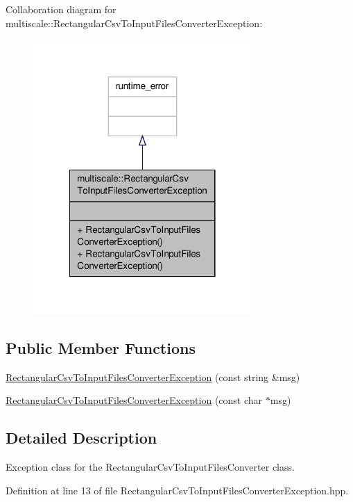 Collaboration diagram for multiscale\-:\-:Rectangular\-Csv\-To\-Input\-Files\-Converter\-Exception\-:\nopagebreak
\begin{figure}[H]
\begin{center}
\leavevmode
\includegraphics[width=236pt]{classmultiscale_1_1RectangularCsvToInputFilesConverterException__coll__graph}
\end{center}
\end{figure}
\subsection*{Public Member Functions}
\begin{DoxyCompactItemize}
\item 
\hyperlink{classmultiscale_1_1RectangularCsvToInputFilesConverterException_aa47c1e9c3dcaff5426a6192222abc6a4}{Rectangular\-Csv\-To\-Input\-Files\-Converter\-Exception} (const string \&msg)
\item 
\hyperlink{classmultiscale_1_1RectangularCsvToInputFilesConverterException_a6053966510b7c81b310b08979cfbfde1}{Rectangular\-Csv\-To\-Input\-Files\-Converter\-Exception} (const char $\ast$msg)
\end{DoxyCompactItemize}


\subsection{Detailed Description}
Exception class for the Rectangular\-Csv\-To\-Input\-Files\-Converter class. 

Definition at line 13 of file Rectangular\-Csv\-To\-Input\-Files\-Converter\-Exception.\-hpp.



